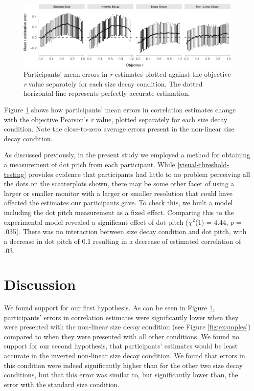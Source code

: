 \documentclass{vgtc}                          %
\begin{document}
\begin{figure}

{\centering \includegraphics[width=1\linewidth]{size_and_scatterplots_files/figure-latex/changes-with-r-size-1} 

}

\caption{Participants' mean errors in \textit{r} estimates plotted against the objective \textit{r} value separately for each size decay condition. The dotted horizontal line represents perfectly accurate estimation.}\label{fig:changes-with-r-size}
\end{figure}

Figure \ref{fig:changes-with-r-size} shows how participants' mean errors in correlation
estimates change with the objective Pearson's \emph{r} value, plotted separately for each
size decay condition. Note the close-to-zero average errors present in the non-linear size
decay condition.

As discussed previously, in the present study we employed a method for obtaining
a measurement of dot pitch from each participant. While \autoref{visual-threshold-testing}
provides evidence that participants had little to no problem perceiving all the dots
on the scatterplots shown, there may be some other facet of using a larger or smaller
monitor with a larger or smaller resolution that could have affected the estimates
our participants gave. To check this, we built a model including the dot pitch
measurement as a fixed effect. Comparing this to the experimental model revealed
a significant effect of dot pitch (\(\chi^2\)(1) = 4.44, \emph{p} = .035).
There was no interaction between size decay condition and dot pitch, with a decrease
in dot pitch of 0.1 resulting in a decrease of estimated correlation of .03.

\hypertarget{discussion}{%
\section{Discussion}\label{discussion}}

We found support for our first hypothesis. As can be seen in Figure \ref{fig:changes-with-r-size},
participants' errors in correlation estimates were significantly lower when
they were presented with the non-linear size decay condition (see Figure \ref{fig:examples})
compared to when they were presented with all other conditions. We found no support
for our second hypothesis, that participants' estimates would be least accurate in the
inverted non-linear size decay condition. We found that
errors in this condition were indeed significantly higher than for the other
two size decay conditions, but that this error was similar to, but significantly lower than,
the error with the standard size condition.
\end{document}
